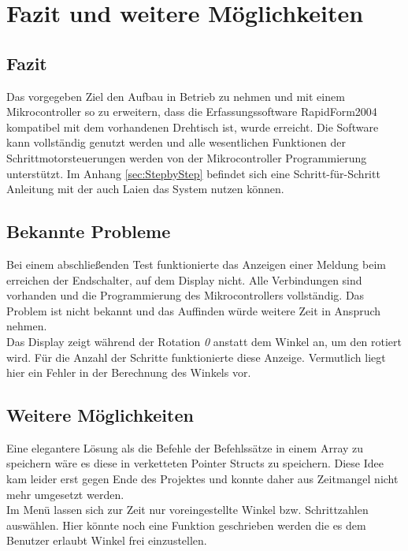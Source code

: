 \chapter{Fazit und weitere Möglichkeiten}
\label{cha:Fazit}
\section{Fazit}
Das vorgegeben Ziel den Aufbau in Betrieb zu nehmen und mit einem Mikrocontroller so zu erweitern, dass die Erfassungssoftware RapidForm2004 kompatibel mit dem vorhandenen Drehtisch ist, wurde erreicht. Die Software kann vollständig genutzt werden und alle wesentlichen Funktionen der Schrittmotorsteuerungen werden von der Mikrocontroller Programmierung unterstützt. Im Anhang \ref{sec:StepbyStep} befindet sich eine Schritt-für-Schritt Anleitung mit der auch Laien das System nutzen können.
\section{Bekannte Probleme}
Bei einem abschließenden Test funktionierte das Anzeigen einer Meldung beim erreichen der Endschalter, auf dem Display nicht. Alle Verbindungen sind vorhanden und die Programmierung des Mikrocontrollers vollständig. Das Problem ist nicht bekannt und das Auffinden würde weitere Zeit in Anspruch nehmen.\\
Das Display zeigt während der Rotation \emph{0} anstatt dem Winkel an, um den rotiert wird. Für die Anzahl der Schritte funktionierte diese Anzeige. Vermutlich liegt hier ein Fehler in der Berechnung des Winkels vor.
\section{Weitere Möglichkeiten}
Eine elegantere Lösung als die Befehle der Befehlssätze in einem Array zu speichern wäre es diese in verketteten Pointer Structs zu speichern. Diese Idee kam leider erst gegen Ende des Projektes und konnte daher aus Zeitmangel nicht mehr umgesetzt werden.\\
Im Menü lassen sich zur Zeit nur voreingestellte Winkel bzw. Schrittzahlen auswählen. Hier könnte noch eine Funktion geschrieben werden die es dem Benutzer erlaubt Winkel frei einzustellen.
